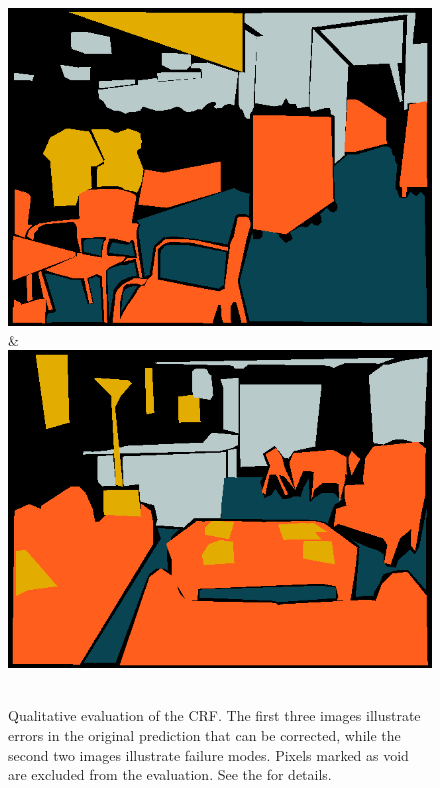 \documentclass[a4paper, 10pt, conference]{ieeeconf}      %
\begin{document}
\begin{figure}
\begin{tabu}
    \includegraphics[width=\linewidth]{images/00118_gt.png}&%
    \includegraphics[width=\linewidth]{images/01203_gt.png}\\
    \vspace{3mm}\\
    \end{tabu}
\caption{%
Qualitative evaluation of the CRF.
The first three images illustrate errors in the original prediction that can be corrected, while
the second two images illustrate failure modes. Pixels marked as void
are excluded from the evaluation. See the  for details.
}
\end{figure}
\end{document}
